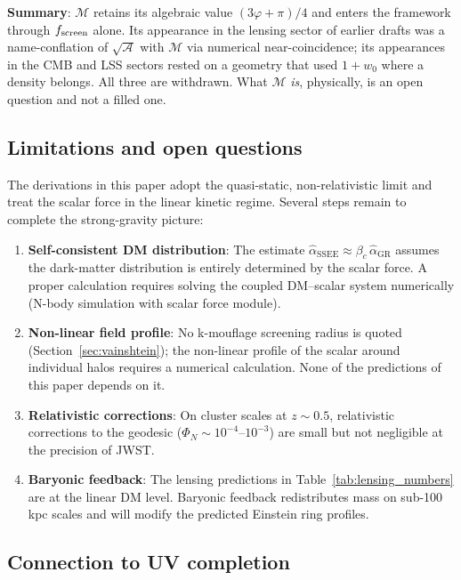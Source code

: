 \documentclass[12pt,a4paper]{article}
\newcommand{\phiG}{\varphi}
\newcommand{\MIRA}{\mathcal{M}}
\newcommand{\AURA}{\mathcal{A}}
\newcommand{\bc}{\beta_c}
\newcommand{\hatalf}{\hat{\alpha}}
\begin{document}
\textbf{Summary}: $\MIRA$ retains its algebraic value $(3\phiG+\pi)/4$ and
enters the framework through $f_{\rm screen}$ alone.  Its appearance in the
lensing sector of earlier drafts was a name-conflation of $\sqrt{\AURA}$
with $\MIRA$ via numerical near-coincidence; its appearances in the CMB and
LSS sectors rested on a geometry that used $1+w_0$ where a density belongs.
All three are withdrawn.  What $\MIRA$ \emph{is}, physically, is an open
question and not a filled one.

\subsection{Limitations and open questions}

The derivations in this paper adopt the quasi-static, non-relativistic
limit and treat the scalar force in the linear kinetic regime.
Several steps remain to complete the strong-gravity picture:

\begin{enumerate}
  \item \textbf{Self-consistent DM distribution}: The estimate
        $\hatalf_{\mathrm{SSEE}} \approx \bc\,\hatalf_{\mathrm{GR}}$
        assumes the dark-matter distribution is entirely determined by the
        scalar force.
        A proper calculation requires solving the coupled DM--scalar system
        numerically (N-body simulation with scalar force module).

  \item \textbf{Non-linear field profile}: No k-mouflage screening radius
        is quoted (Section~\ref{sec:vainshtein}); the non-linear profile of
        the scalar around individual halos requires a numerical calculation.
        None of the predictions of this paper depends on it.

  \item \textbf{Relativistic corrections}: On cluster scales at $z \sim 0.5$,
        relativistic corrections to the geodesic
        ($\Phi_N \sim 10^{-4}$--$10^{-3}$) are small but not negligible
        at the precision of JWST.

  \item \textbf{Baryonic feedback}: The lensing predictions in
        Table~\ref{tab:lensing_numbers} are at the linear DM level.
        Baryonic feedback redistributes mass on sub-100 kpc scales and
        will modify the predicted Einstein ring profiles.
\end{enumerate}

\subsection{Connection to UV completion}
\end{document}
